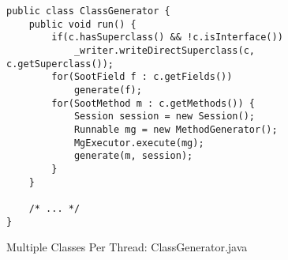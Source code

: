 \documentclass{dithesis}
\begin{document}
        \begin{figure}[H]
\begin{lstlisting}
public class ClassGenerator {
    public void run() {
        if(c.hasSuperclass() && !c.isInterface())
            _writer.writeDirectSuperclass(c, c.getSuperclass());
        for(SootField f : c.getFields())
            generate(f);
        for(SootMethod m : c.getMethods()) {
            Session session = new Session();
            Runnable mg = new MethodGenerator();
            MgExecutor.execute(mg);
            generate(m, session);
        }
    }

    /* ... */
}
\end{lstlisting}
        \caption{Multiple Classes Per Thread: ClassGenerator.java}
        \end{figure}
\end{document}

